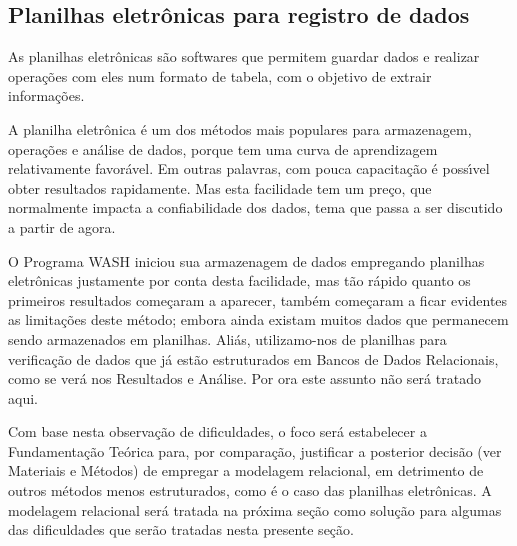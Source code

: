 \documentclass[
12pt,		%
openright,	%
twoside,  %
a4paper,			%
chapter=TITLE,		%
english,			%
french,				%
spanish,			%
brazil				%
]{USPSC-classe/USPSC}
\begin{document}
\subsection[Planilhas eletr\^onicas para registro de dados]{Planilhas eletr\^onicas para registro de dados}\label{Planilhas eletr\^onicas para registro de dados}
As planilhas eletr\^onicas s\~ao softwares que permitem guardar dados e realizar opera\c{c}\~oes com eles num formato de tabela, com o objetivo de  extrair informa\c{c}\~oes.









A planilha eletr\^onica \'e um dos m\'etodos mais populares para armazenagem, opera\c{c}\~oes e an\'alise de dados, porque tem uma curva de aprendizagem relativamente favor\'avel. Em outras palavras, com pouca capacita\c{c}\~ao \'e poss\'{\i}vel obter resultados rapidamente. Mas esta facilidade tem um pre\c{c}o, que normalmente impacta a confiabilidade dos dados, tema que passa a ser discutido a partir de agora.









O Programa WASH iniciou sua armazenagem de dados empregando planilhas eletr\^onicas justamente por conta desta facilidade, mas t\~ao r\'apido quanto os primeiros resultados come\c{c}aram a aparecer, tamb\'em come\c{c}aram a ficar evidentes as limita\c{c}\~oes deste m\'etodo; embora ainda existam muitos dados que permanecem sendo armazenados em planilhas. Ali\'as, utilizamo-nos de planilhas para verifica\c{c}\~ao de dados que j\'a est\~ao estruturados em Bancos de Dados Relacionais, como se ver\'a nos Resultados e An\'alise. Por ora este assunto n\~ao ser\'a tratado aqui.









Com base nesta observa\c{c}\~ao de dificuldades, o foco  ser\'a estabelecer a Fundamenta\c{c}\~ao Te\'orica para, por compara\c{c}\~ao, justificar a posterior decis\~ao (ver Materiais e M\'etodos) de empregar a modelagem relacional, em detrimento de outros m\'etodos menos estruturados, como \'e o caso das planilhas eletr\^onicas. A modelagem relacional ser\'a tratada na pr\'oxima se\c{c}\~ao como solu\c{c}\~ao para algumas das dificuldades que ser\~ao tratadas nesta presente se\c{c}\~ao.
\end{document}
